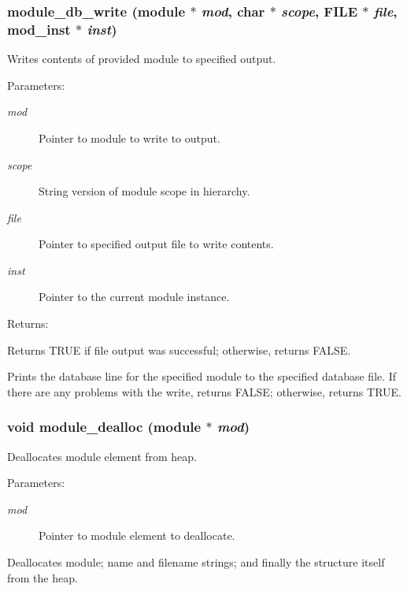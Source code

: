 \subsubsection{ module\_\-db\_\-write ({\bf module} $\ast$ {\em mod}, char $\ast$ {\em scope}, FILE $\ast$ {\em file}, {\bf mod\_\-inst} $\ast$ {\em inst})}\label{module_8h_a2}


Writes contents of provided module to specified output.

\begin{Desc}
\item[Parameters: ]\par
\begin{description}
\item[{\em 
mod}]Pointer to module to write to output. \item[{\em 
scope}]String version of module scope in hierarchy. \item[{\em 
file}]Pointer to specified output file to write contents. \item[{\em 
inst}]Pointer to the current module instance.\end{description}
\end{Desc}
\begin{Desc}
\item[Returns: ]\par
Returns TRUE if file output was successful; otherwise, returns FALSE.\end{Desc}
Prints the database line for the specified module to the specified database file. If there are any problems with the write, returns FALSE; otherwise, returns TRUE. 
\subsubsection{\setlength{\rightskip}{0pt plus 5cm}void module\_\-dealloc ({\bf module} $\ast$ {\em mod})}\label{module_8h_a8}


Deallocates module element from heap.

\begin{Desc}
\item[Parameters: ]\par
\begin{description}
\item[{\em 
mod}]Pointer to module element to deallocate.\end{description}
\end{Desc}
Deallocates module; name and filename strings; and finally the structure itself from the heap. 
